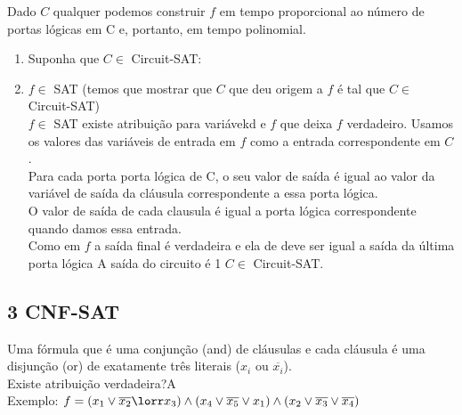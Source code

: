 \documentclass[a4paper,oneside,article,table]{article}
\begin{document}
            Dado $C$ qualquer podemos construir $f$ em tempo proporcional ao número de portas lógicas em C e, portanto, em tempo polinomial.
            \begin{enumerate}
                \item Suponha que $C \in$ Circuit-SAT:

                \item $f \in$ SAT (temos que mostrar que $C$ que deu origem a $f$ é tal que $C \in$ Circuit-SAT)\\
                    $f \in$ SAT \rightarrow existe atribuição para variávekd e $f$ que deixa $f$ verdadeiro. Usamos os valores das variáveis de entrada em $f$ como a entrada correspondente em $C$.\\
                    Para cada porta porta lógica de C, o seu valor de saída é igual ao valor da variável de saída da cláusula correspondente a essa porta lógica.\\
                    O valor de saída de cada clausula é igual a porta lógica correspondente quando damos essa entrada.\\
                    Como em $f$ a saída final é verdadeira e ela de deve ser igual a saída da última porta lógica \rightarrow A saída do circuito é 1 \rightarrow $C \in$ Circuit-SAT.
            \end{enumerate}

            \subsection{3 CNF-SAT}
            Uma fórmula que é uma conjunção (and) de cláusulas e cada cláusula é uma disjunção (or) de exatamente três literais ($x_i$ ou $\overline{x_i}$).\\
            Existe atribuição verdadeira?A\\
            Exemplo: $f = (x_1 \lor \overline{x_2} \lorr x_3)\land(x_4 \lor \overline{x_5} \lor x_1)\land(x_2 \lor \overline{x_3} \lor \overline{x_4})$
\end{document}

